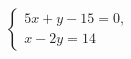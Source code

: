\begin{ex}
	\begin{condition}
		\( \left\{
		\begin{array}{l}
			5x+y-15=0,\\
			x-2y=14
		\end{array}
		\right. \)
	\end{condition}
\end{ex}